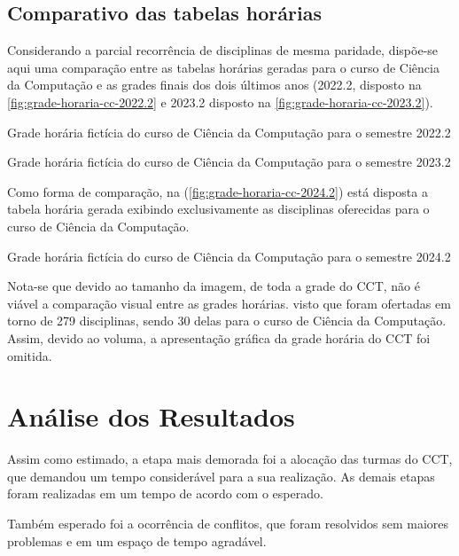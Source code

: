 \subsection{Comparativo das tabelas horárias}

Considerando a parcial recorrência de disciplinas de mesma paridade, dispõe-se aqui uma comparação entre as tabelas horárias geradas para o curso de Ciência da Computação e as grades finais dos dois últimos anos (2022.2, disposto na \autoref{fig:grade-horaria-cc-2022.2} e 2023.2 disposto na \autoref{fig:grade-horaria-cc-2023.2}).

\begin{MyCenteredFigure}
  \caption{Grade horária fictícia do curso de Ciência da Computação para o semestre 2022.2}
  \label{fig:grade-horaria-cc-2022.2}
\end{MyCenteredFigure}

\begin{MyCenteredFigure}
  \caption{Grade horária fictícia do curso de Ciência da Computação para o semestre 2023.2}
  \label{fig:grade-horaria-cc-2023.2}
\end{MyCenteredFigure}

Como forma de comparação, na (\autoref{fig:grade-horaria-cc-2024.2}) está disposta a tabela horária gerada exibindo exclusivamente as disciplinas oferecidas para o curso de Ciência da Computação.

\begin{MyCenteredFigure}
  \caption{Grade horária fictícia do curso de Ciência da Computação para o semestre 2024.2}
  \label{fig:grade-horaria-cc-2024.2}
\end{MyCenteredFigure}

Nota-se que devido ao tamanho da imagem, de toda a grade do CCT, não é viável a comparação visual entre as grades horárias. visto que foram ofertadas em torno de 279 disciplinas, sendo 30 delas para o curso de Ciência da Computação. Assim, devido ao voluma, a apresentação gráfica da grade horária do CCT foi omitida.

\section{Análise dos Resultados}

Assim como estimado, a etapa mais demorada foi a alocação das turmas do CCT, que demandou um tempo considerável para a sua realização. As demais etapas foram realizadas em um tempo de acordo com o esperado.

Também esperado foi a ocorrência de conflitos, que foram resolvidos sem maiores problemas e em um espaço de tempo agradável.

